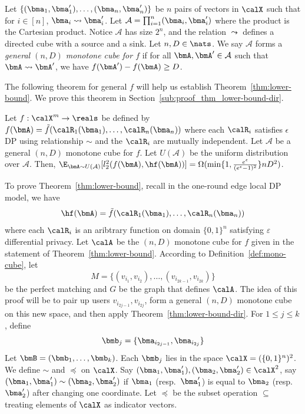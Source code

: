 \begin{definition}
  Let $\{(\bma_1,\bma_1'), \ldots, \allowbreak 
  (\bma_n,\bma_n')\}$ be
  $n$ pairs of vectors in $\calX$ such that
  for $i \in [n]$, 
  $\bma_i \leadsto \bma_i'$.
  Let $\mathcal{A} = \prod_{i=1}^n
  (\bma_i, \bma_i')$ where the product is the Cartesian product.
  Notice $\mathcal{A}$ has size $2^n$, and the relation $\leadsto$ defines a
  directed cube with a source and a sink.
  Let $n,D \in \nats$. 
  We say $\mathcal{A}$ forms a \emph{general $(n,D)$ monotone cube for $f$} if for all
  $\bmA, \bmA' \in \mathcal{A}$ such that $\bmA \leadsto \bmA'$,
  we have $f(\bmA') - f(\bmA) \geq D$.
\end{definition}

The following theorem for general $f$ will help us establish
Theorem~\ref{thm:lower-bound}. We prove this theorem in
Section~\ref{sub:proof_thm_lower-bound-dir}.
\begin{theorem}\label{thm:lower-bound-dir}
  Let $f : \calX^{m} \rightarrow \reals$ be defined by 
  $f(\bmA) = \tilde{f}(\calR_1(\bma_1), \ldots, \calR_n(\bma_n))$ where each 
  $\calR_i$ satisfies $\epsilon$ DP using relationship $\sim$ and the 
  $\calR_i$ are mutually independent.
  Let $\mathcal{A}$ be a general $(n,D)$ monotone cube for $f$. 
  Let $U(\mathcal{A})$ be the uniform distribution over $\mathcal{A}$. 
  Then,
  $\E_{\bmA \sim U(\mathcal{A})}[l_2^2(f(\bmA), \hf(\bmA))] =
  \Omega(\min\{1, \frac{e^\epsilon}{(e^\epsilon-1)^2}\}nD^2)$.
\end{theorem}

To prove Theorem~\ref{thm:lower-bound}, recall in the one-round edge local DP
model, we have
\[
  \hf(\bmA) = \tilde{f}(\calR_1(\bma_1),\ldots,\calR_n(\bma_n))
\]
where each $\calR_i$ is an aribtrary function on domain $\{0,1\}^n$ satisfying $\varepsilon$ 
differential privacy. Let $\calA$ be the $(n,D)$ monotone cube for $f$ given in
the statement of Theorem~\ref{thm:lower-bound}. According to
Definition~\ref{def:mono-cube}, let
\[
  M = \{(v_{i_1}, v_{i_2}), \ldots, (v_{i_{2k-1}}, v_{i_{2k}})\}
\]
be the perfect matching and $G$ be the graph that defines $\calA$. 
The idea of this proof will be to
pair up users $v_{i_{2j-1}}, v_{i_{2j}}$, form a general $(n,D)$ monotone cube
on this new space, and then apply Theorem~\ref{thm:lower-bound-dir}.
For $1 \leq j \leq k$, define
\[
  \bmb_j = \{\bma_{i_{2j-1}}, \bma_{i_{2j}} \}
\]
Let $\bmB = (\bmb_1,\ldots,\bmb_k)$.
Each $\bmb_j$ lies in the space $\calX = (\{0,1\}^n)^2$. We define $\sim$ and
$\preccurlyeq$ on $\calX$. Say $(\bma_1, \bma_1'), (\bma_2, \bma_2') \in
\calX^2$, say $(\bma_1, \bma_1') \sim (\bma_2, \bma_2')$ if $\bma_1$
(resp.~$\bma_1'$) is equal to $\bma_2$ (resp.~$\bma_2'$) after changing one
coordinate. Let $\preccurlyeq$ be the subset operation $\subseteq$ treating
elements of $\calX$ as indicator vectors.

